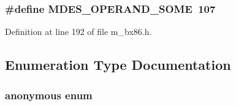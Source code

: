 \subsubsection{\setlength{\rightskip}{0pt plus 5cm}\#define MDES\_\-OPERAND\_\-SOME~107}\label{m__bx86_8h_9ac31f10bbc433299aaf9ae64bc4486d}




Definition at line 192 of file m\_\-bx86.h.

\subsection{Enumeration Type Documentation}
\subsubsection{\setlength{\rightskip}{0pt plus 5cm}anonymous enum}\label{m__bx86_8h_99fb83031ce9923c84392b4e92f956b5}


